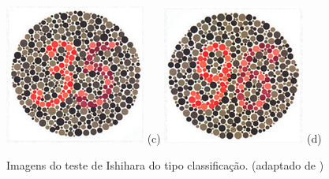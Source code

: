 \documentclass[	12pt, Times, openright, twoside, a4paper, english, brazil]{abntex2}
\begin{document}
\begin{apendicesenv}
\begin{figure}[!htb]
\centering
{\includegraphics[width=\linewidth]{ishihara-classificacao/figureIshihara24.png}}
(c)
\endminipage\hfill
{}
\centering
{\includegraphics[width=\linewidth]{ishihara-classificacao/figureIshihara25.png}}
(d)
\endminipage\hfill

\caption{Imagens do teste de Ishihara do tipo classificação. (adaptado de )}
\label{fig:apendiceClassificacao}

\end{figure}


\end{apendicesenv}
\end{document}
